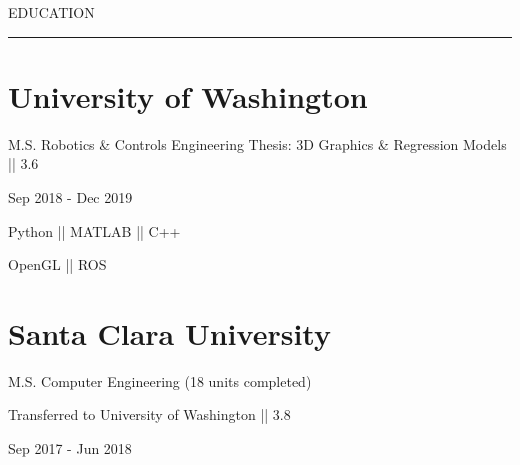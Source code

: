 \documentclass[letterpaper,10pt,oneside]{article}
\begin{document}
\begin{body}


\vspace{2ex}

{\color{cblue}
{EDUCATION} %
}

\vspace{-4.4ex}
\hspace{-1.25in}\noindent\color{dblue}\rule{6.935in}{0.4pt} 
\vspace{-5.5ex}

\section
{\textbf{University of Washington}}{}

{\small M.S. Robotics \& Controls Engineering}
\BulletItem
{\small Thesis: 3D Graphics \& Regression Models || 3.6}

\begin{subtitle}
\vspace{-8ex}
{{Sep 2018 - Dec 2019}}
\end{subtitle}

\vspace{-1ex}

{
\vspace{1.4ex}
\color{cyan}\small
{Python || MATLAB || C++} %
}

{
\vspace{-2.5ex}\hspace{3.17in}
\color{cyan}\small
{OpenGL || ROS} %
}
\vspace{-1.5ex}


\section
{\textbf{Santa Clara University}}{}{}

{{\small M.S. Computer Engineering (18 units completed)}}
\begin{detail}
\BulletItem
Transferred to University of Washington || 3.8
\end{detail}

\begin{subtitle}
\vspace{-8ex}
{{Sep 2017 - Jun 2018}}
\end{subtitle}


\end{body}
\end{document}
